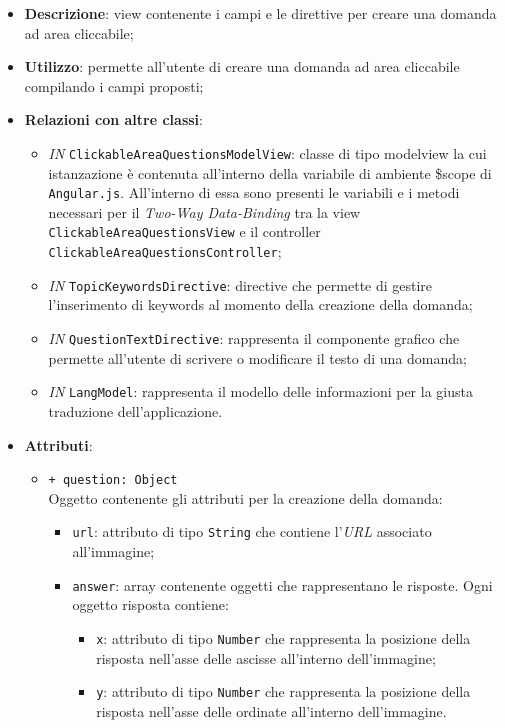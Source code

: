 \begin{itemize}
	\item \textbf{Descrizione}: view contenente i campi e le direttive per creare una domanda ad area cliccabile;
	\item \textbf{Utilizzo}:  permette all'utente di creare una domanda ad area cliccabile compilando i campi proposti;
	\item \textbf{Relazioni con altre classi}:
	\begin{itemize}
		\item \textit{IN} \texttt{ClickableAreaQuestionsModelView}: classe di tipo modelview la cui istanzazione è contenuta all'interno della variabile di ambiente \$scope di \texttt{Angular.js}. All'interno di essa sono presenti le variabili e i metodi necessari per il \textit{Two-Way Data-Binding} tra la view \texttt{ClickableAreaQuestionsView} e il controller \texttt{ClickableAreaQuestionsController};
		\item \textit{IN} \texttt{TopicKeywordsDirective}: directive che permette di gestire l'inserimento di keywords al momento della creazione della domanda;
		\item \textit{IN} \texttt{QuestionTextDirective}: rappresenta il componente grafico che permette all'utente di scrivere o modificare il testo di una domanda;
		\item \textit{IN} \texttt{LangModel}: rappresenta il modello delle informazioni per la giusta traduzione dell'applicazione.
	\end{itemize}
	\item \textbf{Attributi}:
	\begin{itemize}
		\item \texttt{+ question: Object} \\ Oggetto contenente gli attributi per la creazione della domanda:
		\begin{itemize}
			\item \texttt{url}: attributo di tipo \texttt{String} che contiene l'\textit{URL} associato all'immagine;
			\item \texttt{answer}: array contenente oggetti che rappresentano le risposte. Ogni oggetto risposta contiene:
			\begin{itemize}
				\item \texttt{x}: attributo di tipo \texttt{Number} che rappresenta la posizione della risposta nell'asse delle ascisse all'interno dell'immagine;
				\item \texttt{y}: attributo di tipo \texttt{Number} che rappresenta la posizione della risposta nell'asse delle ordinate all'interno dell'immagine.

\end{itemize}
\end{itemize}
\end{itemize}
\end{itemize}
